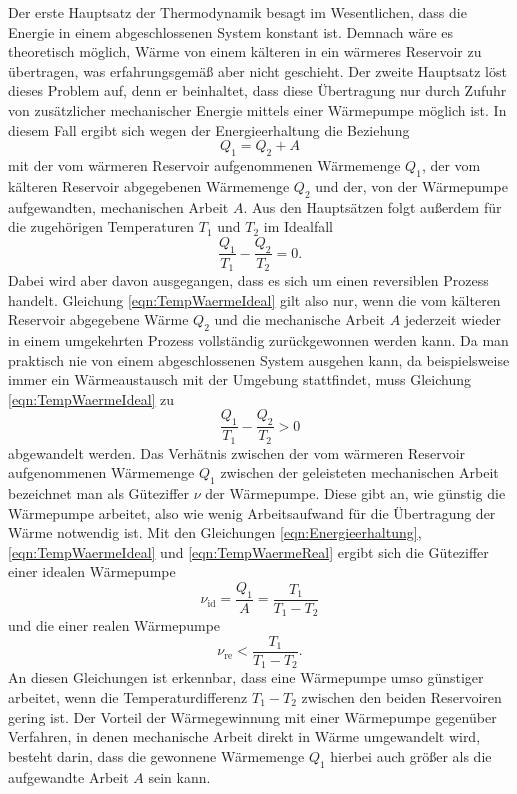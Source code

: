 Der erste Hauptsatz der Thermodynamik
besagt im Wesentlichen, dass die Energie in einem
abgeschlossenen System konstant ist. Demnach wäre es theoretisch möglich,
Wärme von einem kälteren in ein wärmeres Reservoir zu übertragen, was
erfahrungsgemäß aber nicht geschieht.
Der zweite Hauptsatz löst dieses Problem auf, denn er beinhaltet, dass diese
Übertragung nur durch Zufuhr von zusätzlicher mechanischer Energie
mittels einer Wärmepumpe möglich ist. In diesem Fall ergibt sich wegen der
Energieerhaltung die Beziehung
\begin{equation}
  Q_1 = Q_2 + A
  \label{eqn:Energieerhaltung}
\end{equation}
mit der vom wärmeren Reservoir aufgenommenen Wärmemenge $Q_1$, der vom kälteren
Reservoir abgegebenen Wärmemenge $Q_2$ und der, von der Wärmepumpe aufgewandten,
mechanischen Arbeit $A$.
Aus den Hauptsätzen folgt außerdem für die zugehörigen Temperaturen $T_1$ und
$T_2$ im Idealfall
\begin{equation}
  \frac{Q_1}{T_1} - \frac{Q_2}{T_2} = 0.
  \label{eqn:TempWaermeIdeal}
\end{equation}
Dabei wird aber davon ausgegangen, dass es sich um einen reversiblen Prozess
handelt. Gleichung \eqref{eqn:TempWaermeIdeal} gilt also nur, wenn die vom
kälteren Reservoir abgegebene Wärme $Q_2$ und die mechanische Arbeit $A$
jederzeit wieder in einem umgekehrten Prozess vollständig zurückgewonnen werden
kann. Da man praktisch nie von einem abgeschlossenen System ausgehen kann, da
beispielsweise immer ein Wärmeaustausch mit der Umgebung stattfindet, muss
Gleichung \eqref{eqn:TempWaermeIdeal} zu
\begin{equation}
  \frac{Q_1}{T_1} - \frac{Q_2}{T_2} > 0
  \label{eqn:TempWaermeReal}
\end{equation}
abgewandelt werden.
Das Verhätnis zwischen der vom wärmeren Reservoir aufgenommenen Wärmemenge $Q_1$
zwischen der geleisteten mechanischen Arbeit bezeichnet man als Güteziffer $\nu$
der Wärmepumpe. Diese gibt an, wie günstig die Wärmepumpe arbeitet, also wie
wenig Arbeitsaufwand für die Übertragung der Wärme notwendig ist.
Mit den Gleichungen \eqref{eqn:Energieerhaltung}, \eqref{eqn:TempWaermeIdeal}
und \eqref{eqn:TempWaermeReal} ergibt sich die Güteziffer einer idealen
Wärmepumpe
\begin{equation}
  \nu_\text{id} = \frac{Q_1}{A} = \frac{T_1}{T_1-T_2}
\end{equation}
und die einer realen Wärmepumpe
\begin{equation}
  \nu_\text{re} < \frac{T_1}{T_1-T_2}.
\end{equation}
An diesen Gleichungen ist erkennbar, dass eine Wärmepumpe umso günstiger
arbeitet, wenn die Temperaturdifferenz $T_1-T_2$ zwischen den beiden Reservoiren
gering ist.
Der Vorteil der Wärmegewinnung mit einer Wärmepumpe gegenüber Verfahren, in
denen mechanische Arbeit direkt in Wärme umgewandelt wird, besteht darin, dass
die gewonnene Wärmemenge $Q_1$ hierbei auch größer als die aufgewandte Arbeit
$A$ sein kann.

